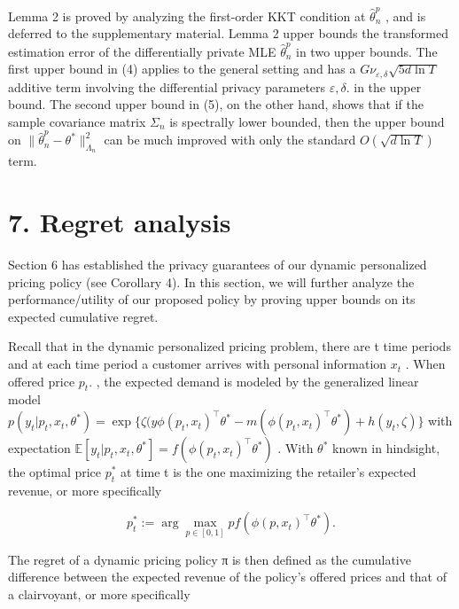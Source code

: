 Lemma 2 is proved by analyzing the first-order KKT condition at \(\widehat { \theta } _ { n } ^ { p }\) , and is deferred to the supplementary material. Lemma 2 upper bounds the transformed estimation error of the differentially private MLE \(\widehat { \theta } _ { n } ^ { p }\) in two upper bounds. The first upper bound in (4) applies to the general setting and has a \(G \nu _ { \varepsilon , \delta } \sqrt { 5 d \ln T }\) additive term involving the differential privacy parameters \(\varepsilon , \delta .\) in the upper bound. The second upper bound in (5), on the other hand, shows that if the sample covariance matrix \(\Sigma _ { n }\) is spectrally lower bounded, then the upper bound on \(\| \widehat { \theta } _ { n } ^ { p } - \theta ^ { * } \| _ { \Lambda _ { n } } ^ { 2 }\) can be much improved with only the standard \(O ( { \sqrt { d \ln T } } )\) term.

\section{7. Regret analysis}\label{regret-analysis}

Section 6 has established the privacy guarantees of our dynamic personalized pricing policy (see Corollary 4). In this section, we will further analyze the performance/utility of our proposed policy by proving upper bounds on its expected cumulative regret.

Recall that in the dynamic personalized pricing problem, there are t time periods and at each time period a customer arrives with personal information \(x _ { t }\) . When offered price \(p _ { t } .\) , the expected demand is modeled by the generalized linear model \(p ( y _ { t } | p _ { t } , x _ { t } , \theta ^ { * } ) = \exp \{ \zeta ( y \phi ( p _ { t } , x _ { t } ) ^ { \top } \theta ^ { * } - m ( \phi ( p _ { t } , x _ { t } ) ^ { \top } \theta ^ { * } ) + h ( y _ { t } , \zeta ) \}\) with expectation \(\mathbb { E } [ y _ { t } | p _ { t } , x _ { t } , \theta ^ { * } ] = f ( \phi ( p _ { t } , x _ { t } ) ^ { \top } \theta ^ { * } )\) . With \(\theta ^ { * }\) known in hindsight, the optimal price \(p _ { t } ^ { * }\) at time t is the one maximizing the retailer's expected revenue, or more specifically

\[
p _ {t} ^ {*} := \arg \max _ {p \in [ 0, 1 ]} p f (\phi (p, x _ {t}) ^ {\top} \theta^ {*}).
\]

The regret of a dynamic pricing policy π is then defined as the cumulative difference between the expected revenue of the policy's offered prices and that of a clairvoyant, or more specifically

